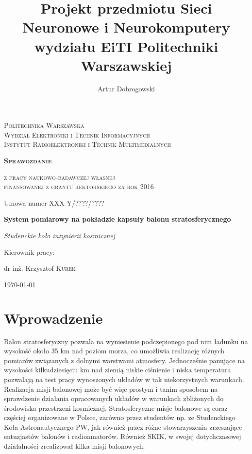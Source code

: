 \documentclass[a4paper,12pt]{article}
\title{Projekt przedmiotu Sieci Neuronowe i Neurokomputery wydziału EiTI Politechniki Warszawskiej}
\author{Artur Dobrogowski}
\begin{document}
\begin{titlepage}
	\centering
	\par\vspace{1cm}
	{\scshape\Large Politechnika Warszawska\\Wydział Elektroniki i Technik Informacyjnych\\Instytut Radioelektroniki i Technik Multimedialnych \par}
	\vspace{1cm}
	{\huge\scshape\bfseries Sprawozdanie\\\par}
	{\scshape\Large z pracy naukowo-badawczej własnej\\ finansowanej z grantu rektorskiego za rok 2016\\\par}
	{\Large Umowa numer XXX Y/????/????\\\par}
	\vspace{1.5cm}
	{\Large\bfseries System pomiarowy na pokładzie kapsuły balonu stratosferycznego\\\par}
	\vspace{2cm}
	{\Large\itshape Studenckie koło inżynierii kosmicznej\par}
	\vfill
	Kierownik pracy:\par
	dr inż. Krzysztof \textsc{Kurek}

	\vfill

	{\large \today\par}
\end{titlepage}

\section{Wprowadzenie}
Balon stratosferyczny pozwala na wyniesienie podczepionego pod nim ładunku na wysokość około 35 km nad poziom morza, co umożliwia realizację różnych pomiarów związanych z dolnymi warstwami atmosfery. Jednocześnie panujące na wysokości kilkudziesięciu km nad ziemią  niskie ciśnienie i niska temperatura pozwalają na test pracy wynoszonych układów w tak niekorzystnych warunkach. Realizacja misji balonowej może być więc prostym i tanim sposobem na sprawdzenie działania opracowanych układów w warunkach zbliżonych do środowiska przestrzeni kosmicznej.
Stratosferyczne misje balonowe są coraz częściej organizowane w Polsce, zarówno przez studentów np. ze Studenckiego Koła Astronautycznego PW, jak  również przez różne stowarzyszenia zrzeszające entuzjastów balonów i radioamatorów. 
Również SKIK, w swojej dotychczasowej działalności zrealizował kilka misji balonowych.
\end{document}
